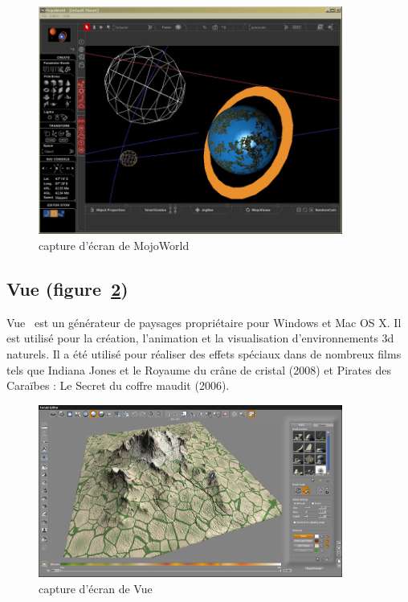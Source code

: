 \begin{figure}[!ht]
    \begin{center}
        \includegraphics[width=10cm]{resources/mojoworld.jpg}
        \caption{capture d'écran de MojoWorld}
        \label{fig:mojoworld}
    \end{center}
\end{figure}

\subsection{Vue (figure~\ref{fig:vue})}
Vue~\cite{Vue} est un générateur de paysages propriétaire pour Windows et Mac OS X.
Il est utilisé pour la création, l'animation et la visualisation d'environnements 3d naturels. Il a été utilisé pour réaliser des effets spéciaux dans de
nombreux films tels que Indiana Jones et le Royaume du crâne de cristal (2008) et Pirates des Caraïbes : Le Secret du coffre maudit (2006).
\begin{figure}[!ht]
    \begin{center}
        \includegraphics[width=10cm]{resources/vue.jpg}
        \caption{capture d'écran de Vue}
        \label{fig:vue}
    \end{center}
\end{figure}


